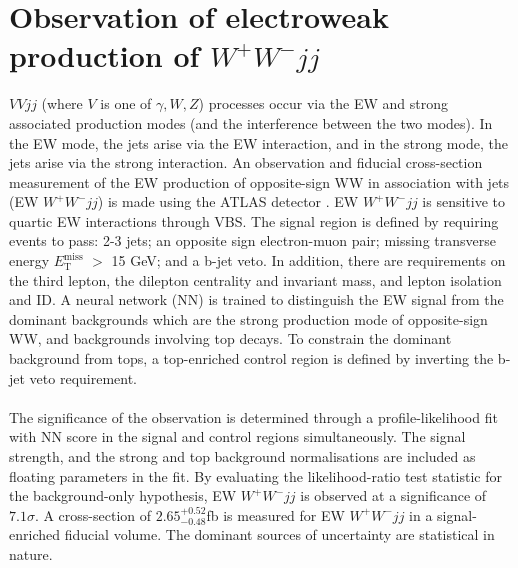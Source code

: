 \documentclass{v23windows}
\begin{document}
\section{Observation of electroweak production of $W^+W^-jj$}
$VVjj$ (where $V$ is one of $\gamma,W,Z$) processes occur via the EW and strong associated production modes (and the interference between the two modes). In the EW mode, the jets arise via the EW interaction, and in the strong mode, the jets arise via the strong interaction. An observation and fiducial cross-section measurement of the EW production of opposite-sign WW in association with jets (EW $W^+W^-jj$) is made using the ATLAS detector \cite{osww}. EW $W^+W^-jj$ is sensitive to quartic EW interactions through VBS. The signal region is defined by requiring events to pass: 2-3 jets; an opposite sign electron-muon pair; missing transverse energy $E_\mathrm{T}^{\mathrm{miss}}$ $>$ 15 GeV; and a b-jet veto.
In addition, there are requirements on the third lepton, the dilepton centrality and invariant mass, and lepton isolation and ID.  
A neural network (NN) is trained to distinguish the EW signal from the dominant backgrounds which are the strong production mode of opposite-sign WW, and backgrounds involving top decays. To constrain the dominant background from tops, a top-enriched control region is defined by inverting the b-jet veto requirement. \\\\
The significance of the observation is determined through a profile-likelihood fit with NN score in the signal and control regions simultaneously. The signal strength, and the strong and top background normalisations are included as floating parameters in the fit. By evaluating the likelihood-ratio test statistic for the background-only hypothesis, EW $W^+W^-jj$ is observed at a significance of $7.1\sigma$. A cross-section of $2.65^{+0.52}_{-0.48}$fb is measured for EW $W^+W^-jj$ in a signal-enriched fiducial volume. The dominant sources of uncertainty are statistical in nature. 
\end{document}
